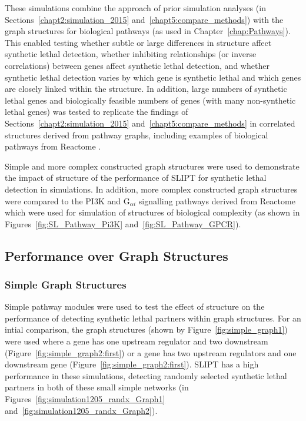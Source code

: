 These simulations combine the approach of prior simulation analyses (in Sections~\ref{chapt2:simulation_2015} and~\ref{chapt5:compare_methods}) with the \gls{graph} structures for biological pathways (as used in Chapter~\ref{chap:Pathways}). This enabled testing whether subtle or large differences in  structure affect \gls{synthetic lethal} detection, whether inhibiting relationships (or inverse correlations) between genes affect \gls{synthetic lethal} detection, and whether \gls{synthetic lethal} detection varies by which gene is \gls{synthetic lethal} and which genes are closely linked within the  structure. In addition, large numbers of \gls{synthetic lethal} genes and biologically feasible numbers of genes (with many non-synthetic lethal genes) was tested to replicate the findings of Sections~\ref{chapt2:simulation_2015} and~\ref{chapt5:compare_methods} in correlated structures derived from pathway graphs, including examples of biological pathways from Reactome \citep{Reactome}.

Simple and more complex constructed \gls{graph} structures were used to demonstrate the impact of  structure of the performance of \gls{SLIPT} for \gls{synthetic lethal} detection in simulations. In addition, more complex constructed \gls{graph} structures were compared to the \gls{PI3K} and G$_{\alpha i}$ signalling pathways derived from Reactome which were used for simulation of  structures of biological complexity (as shown in Figures~\ref{fig:SL_Pathway_Pi3K} and~\ref{fig:SL_Pathway_GPCR}).

\FloatBarrier

\subsection{Performance over Graph Structures}
\label{chapt5:graphsim_performance}

\subsubsection{Simple Graph Structures}
\label{chapt5:graphsim_performance_simple}

\FloatBarrier

Simple pathway modules were used to test the effect of  structure on the performance of detecting \gls{synthetic lethal} partners within \gls{graph} structures. For an intial comparison, the \gls{graph} structures (shown by Figure~\ref{fig:simple_graph1}) were used where a gene has one upstream regulator and two downstream (Figure~\ref{fig:simple_graph2:first}) or a gene has two upstream regulators and one downstream gene (Figure~\ref{fig:simple_graph2:first}). \gls{SLIPT} has a high performance in these simulations, detecting randomly selected \gls{synthetic lethal} partners in both of these small simple networks (in Figures~\ref{fig:simulation1205_randx_Graph1} and~\ref{fig:simulation1205_randx_Graph2}). 

